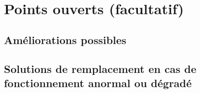 \chapter{Points ouverts (facultatif)}

\section{Améliorations possibles}

\section{Solutions de remplacement en cas de fonctionnement anormal ou dégradé}